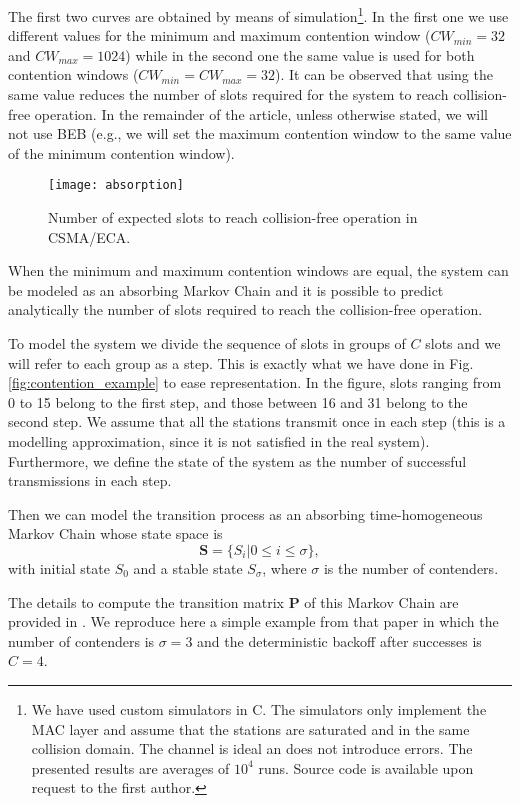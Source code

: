 \documentclass[journal]{IEEEtran}
\begin{document}
The first two curves are obtained by means of simulation\footnote{We have used custom simulators in C. The simulators only implement the MAC layer and assume that the stations are saturated and in the same collision domain. The channel is ideal an does not introduce errors. The presented results are averages of $10^4$ runs. Source code is available upon request to the first author.}. In the first one we use different values for the minimum and maximum contention window ($CW_{min}=32$ and $CW_{max}={1024}$) while in the second one the same value is used for both contention windows ($CW_{min} = CW_{max} = 32$). It can be observed that using the same value reduces the number of slots required for the system to reach collision-free operation. In the remainder of the article, unless otherwise stated, we will not use BEB (e.g., we will set the maximum contention window to the same value of the minimum contention window).

\begin{figure}[!t]
\centering
\texttt{[image: absorption]}
\caption{Number of expected slots to reach collision-free operation in CSMA/ECA.}
\label{fig:absorption}
\end{figure}

When the minimum and maximum contention windows are equal, the system can be modeled as an absorbing Markov Chain and it is possible to predict analytically the number of slots required to reach the collision-free operation.

To model the system we divide the sequence of slots in groups of $C$ slots and we will refer to each group as a step. This is exactly what we have done in Fig. \ref{fig:contention_example} to ease representation. In the figure, slots ranging from 0 to 15 belong to the first step, and those between 16 and 31 belong to the second step. We assume that all the stations transmit once in each step (this is a modelling approximation, since it is not satisfied in the real system). Furthermore, we define the state of the system as the number of successful transmissions in each step.

 Then we can model the transition process as an absorbing time-homogeneous Markov Chain whose state space is 
\begin{equation}
\mathbf{S} =\{S_i | 0 \leq i \leq \sigma \},
\end{equation}
with initial state $S_0$ and a stable state $S_\sigma$, where $\sigma$ is the number of contenders.

The details to compute the transition matrix $\mathbf{P}$ of this Markov Chain are provided in \cite{barcelo2010fcc}. We reproduce here a simple example from that paper in which the number of contenders is $\sigma=3$ and the deterministic backoff after successes is $C=4$.
\end{document}
